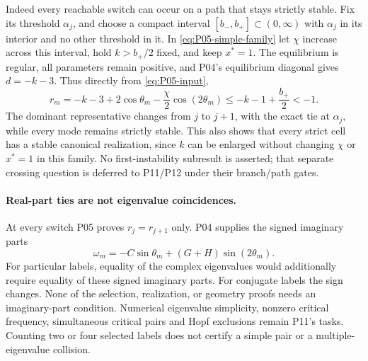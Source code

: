 Indeed every reachable switch can occur on a path that stays strictly
stable. Fix its threshold $\alpha_j$, and choose a compact interval
$[b_-,b_+]\subset(0,\infty)$ with $\alpha_j$ in its interior and no
other threshold in it. In \eqref{eq:P05-simple-family} let $\chi$
increase across this interval, hold $k>b_+/2$ fixed, and keep $x^*=1$.
The equilibrium is regular, all parameters remain positive, and P04's
equilibrium diagonal gives $d=-k-3$. Thus directly from
\eqref{eq:P05-input},
\begin{equation}
 r_m=-k-3+2\cos\theta_m-\frac\chi2\cos(2\theta_m)
       \le-k-1+\frac{b_+}{2}<-1.
 \label{eq:P05-stable-switch}
\end{equation}
The dominant representative changes from $j$ to $j+1$, with the exact
tie at $\alpha_j$, while every mode remains strictly stable. This also
shows that every strict cell has a stable canonical realization, since
$k$ can be enlarged without changing $\chi$ or $x^*=1$ in this family.
No first-instability subresult is asserted; that separate crossing question
is deferred to P11/P12 under their branch/path gates.

\paragraph{Real-part ties are not eigenvalue coincidences.}
At every switch P05 proves $r_j=r_{j+1}$ only. P04 supplies the signed
imaginary parts
\[
 \omega_m=-C\sin\theta_m+(G+H)\sin(2\theta_m).
\]
For particular labels, equality of the complex eigenvalues would additionally
require equality of these signed imaginary parts. For conjugate labels the
sign changes. None of the selection, realization, or geometry proofs needs
an imaginary-part condition. Numerical eigenvalue simplicity, nonzero
critical frequency, simultaneous critical pairs and Hopf exclusions remain
P11's tasks. Counting two or four selected labels does not certify a simple
pair or a multiple-eigenvalue collision.
